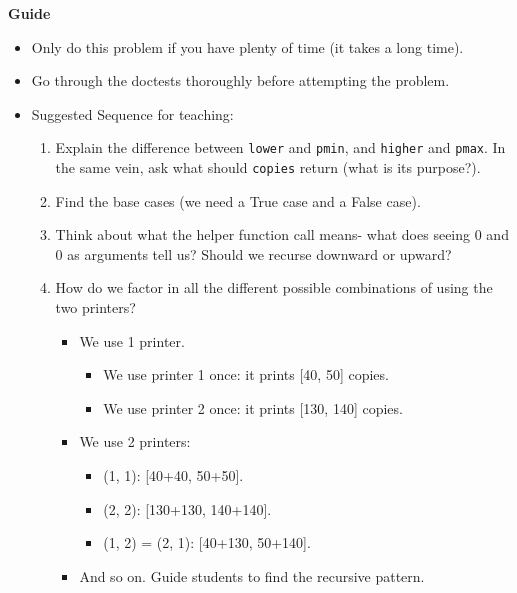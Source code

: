 \begin{blocksection}
\begin{guide}
\textbf{Guide}
\begin{itemize}
    \item Only do this problem if you have plenty of time (it takes a long time).
    \item Go through the doctests thoroughly before attempting the problem.
    \item Suggested Sequence for teaching:
    \begin{enumerate}
        \item Explain the difference between \lstinline{lower} and \lstinline{pmin}, and \lstinline{higher} and \lstinline{pmax}. In the same vein, ask what should \lstinline{copies} return (what is its purpose?).
        \item Find the base cases (we need a True case and a False case).
        \item Think about what the helper function call means- what does seeing 0 and 0 as arguments tell us? Should we recurse downward or upward?
        \item How do we factor in all the different possible combinations of using the two printers?
        \begin{itemize}
            \item We use 1 printer.
            \begin{itemize}
                \item We use printer 1 once: it prints [40, 50] copies.
                \item We use printer 2 once: it prints [130, 140] copies.
            \end{itemize}
            \item We use 2 printers:
            \begin{itemize}
                \item (1, 1): [40+40, 50+50].
                \item (2, 2): [130+130, 140+140].
                \item (1, 2) = (2, 1): [40+130, 50+140].
            \end{itemize}
            \item And so on. Guide students to find the recursive pattern.

        \end{itemize}
    \end{enumerate}
\end{itemize}
\end{guide}
\end{blocksection}
